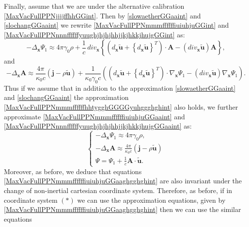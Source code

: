 \documentclass{article}
\theoremstyle{definition}
\theoremstyle{remark}
\renewcommand{\vec}[1]{\mathbf{#1}}
\newcommand{\er}{\eqref}
\newcommand{\er}{\eqref}
\begin{document}
Finally, assume that we are under the alternative calibration
\er{MaxVacFullPPNjjjjffhhGGint}. Then by \er{slowaetherGGaaint} and
\er{slochangGGaaint} we rewrite
\er{MaxVacFullPPNmmmffffffiuiuhjuGGint} and
\er{MaxVacFullPPNnnnffffffyuughjhjhjhhjjkjhkkjhujgGGint} as:
\begin{equation}\label{MaxVacFullPPNmmmffffffiuiuhjuGGaaint}
-\Delta_{\vec x}\Psi_1\approx
4\pi\gamma_0\rho+\frac{1}{c}\,div_{\vec x} \left\{\left(d_{\vec
x}\vec {\tilde u}+\left\{d_{\vec x}\vec {\tilde
u}\right\}^T\right)\cdot\vec A-\left(div_{\vec x}\vec {\tilde
u}\right)\vec A\right\},
\end{equation}
and
\begin{equation}\label{MaxVacFullPPNnnnffffffyuughjhjhjhhjjkjhkkjhujgGGaaint}
-\Delta_{\vec x}\vec A\approx \frac{4\pi}{\kappa_0 c}\left(\vec
j-\rho\vec {\tilde u}\right)+\frac{1}{\kappa_0\gamma_0
c}\left(\left(d_{\vec x}\vec {\tilde u}+\left\{d_{\vec x}\vec
{\tilde u}\right\}^T\right)\cdot \nabla_{\vec
x}\Psi_1-\left(div_{\vec x}\vec {\tilde u}\right)\nabla_{\vec
x}\Psi_1\right).
\end{equation}
Thus if we assume that in addition to the approximation
\er{slowaetherGGaaint} and \er{slochangGGaaint} the approximation
\er{MaxVacFullPPNmmmffffffhhtygghGGGGyuhggghghint} also holds, we
further approximate \er{MaxVacFullPPNmmmffffffiuiuhjuGGaaint} and
\er{MaxVacFullPPNnnnffffffyuughjhjhjhhjjkjhkkjhujgGGaaint} as:
\begin{equation}\label{MaxVacFullPPNmmmffffffiuiuhjuGGaaghgghghint}
\begin{cases}
-\Delta_{\vec x}\Psi_1\approx 4\pi\gamma_0\rho,
\\
-\Delta_{\vec x}\vec A\approx \frac{4\pi}{\kappa_0 c}\left(\vec
j-\rho\vec {\tilde u}\right)\\
\Psi=\Psi_1+\frac{1}{c}\vec A\cdot\vec {\tilde u}.
\end{cases}
\end{equation}
Moreover, as before, we deduce that equations
\er{MaxVacFullPPNmmmffffffiuiuhjuGGaaghgghghint} are also invariant
under the change of non-inertial cartesian coordinate system.
Therefore, as before, if in coordinate system $(*)$ we can use the
approximation equations, given by
\er{MaxVacFullPPNmmmffffffiuiuhjuGGaaghgghghint}
then we can use the similar equations
\end{document}

